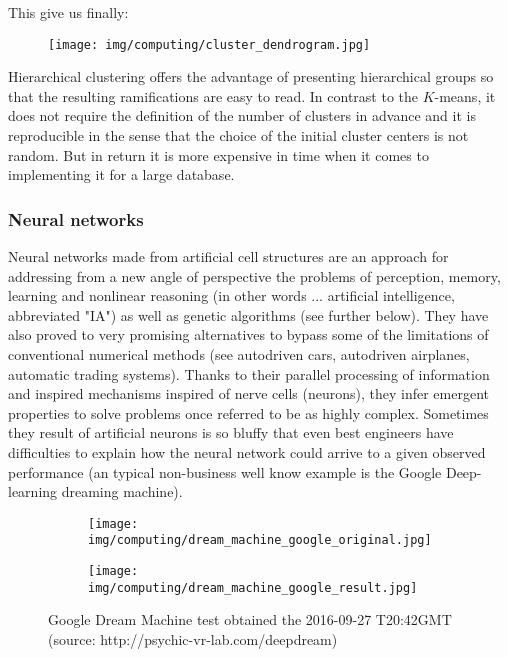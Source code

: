 	This give us finally:
	\begin{figure}[H]
		\centering
		\texttt{[image: img/computing/cluster\_dendrogram.jpg]}
	\end{figure}
	Hierarchical clustering offers the advantage of presenting hierarchical groups so that the resulting ramifications are easy to read. In contrast to the $K$-means, it does not require the definition of the number of clusters in advance and it is reproducible in the sense that the choice of the initial cluster centers is not random. But in return it is more expensive in time when it comes to implementing it for a large database.
	
	\pagebreak
	\subsubsection{Neural networks}\label{neural network}
	Neural networks made from artificial cell structures are an approach for addressing from a new angle of perspective the problems of perception, memory, learning and nonlinear reasoning (in other words ... artificial intelligence, abbreviated "IA") as well as genetic algorithms (see further below). They have also proved to very promising alternatives to bypass some of the limitations of conventional numerical methods (see autodriven cars, autodriven airplanes, automatic trading systems). Thanks to their parallel processing of information and inspired mechanisms inspired of nerve cells (neurons), they infer emergent properties to solve problems once referred to be as highly complex. Sometimes they result of artificial neurons is so bluffy that even best engineers have difficulties to explain how the neural network could arrive to a given observed performance (an typical non-business well know example is the Google Deep-learning dreaming machine).
	\begin{figure}[H]
		\centering
		\begin{subfigure}{.5\textwidth}
		  \centering
		  \texttt{[image: img/computing/dream\_machine\_google\_original.jpg]}
		\end{subfigure}%
		\begin{subfigure}{.5\textwidth}
		  \centering
		  \texttt{[image: img/computing/dream\_machine\_google\_result.jpg]}
		\end{subfigure}
		\caption[Google Dream Machine test]{Google Dream Machine test obtained the 2016-09-27 T20:42GMT (source: http://psychic-vr-lab.com/deepdream)}
	\end{figure}

